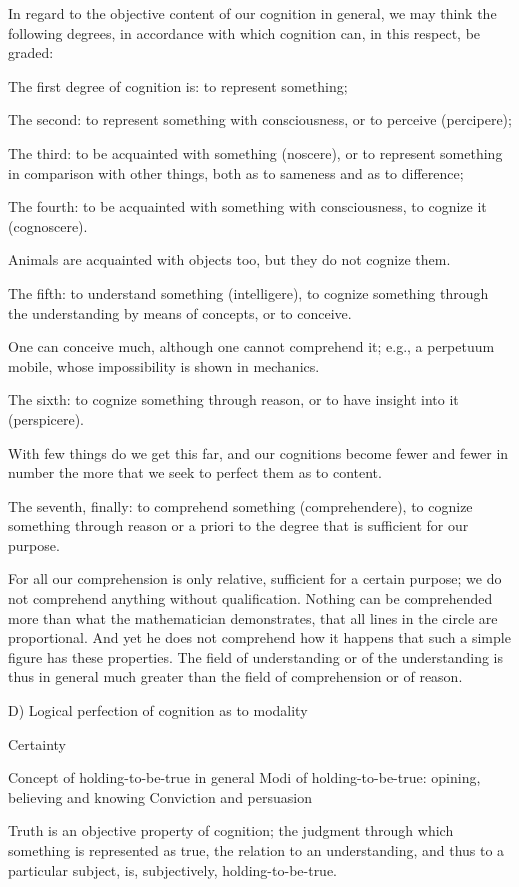 In regard to the objective content of our cognition in general,
we may think the following degrees, in accordance with which
cognition can, in this respect, be graded:

The first degree of cognition is: to represent something;

The second: to represent something with consciousness,
or to perceive (percipere);

The third: to be acquainted with something (noscere), or
to represent something in comparison with other things,
both as to sameness and as to difference;

The fourth: to be acquainted with something with consciousness,
to cognize it (cognoscere).

Animals are acquainted with objects too, but they do not cognize them.

The fifth: to understand something (intelligere),
to cognize something through the understanding by means of concepts,
or to conceive.

One can conceive much, although one cannot comprehend it;
e.g., a perpetuum mobile, whose impossibility is shown in mechanics.

The sixth: to cognize something through reason, or
to have insight into it (perspicere).

With few things do we get this far,
and our cognitions become fewer and fewer in number
the more that we seek to perfect them as to content.

The seventh, finally: to comprehend something (comprehendere),
to cognize something through reason or a priori
to the degree that is sufficient for our purpose.

For all our comprehension is only relative,
sufficient for a certain purpose;
we do not comprehend anything without qualification.
Nothing can be comprehended more than what the mathematician demonstrates,
that all lines in the circle are proportional.
And yet he does not comprehend how it happens that such a simple
figure has these properties.
The field of understanding or of the understanding is thus in general
much greater than the field of comprehension or of reason.

D) Logical perfection of cognition as to modality

Certainty

    Concept of holding-to-be-true in general
    Modi of holding-to-be-true: opining, believing and knowing
    Conviction and persuasion

Truth is an objective property of cognition;
the judgment through which something is represented as true,
the relation to an understanding, and thus to a particular subject, is,
subjectively, holding-to-be-true.

